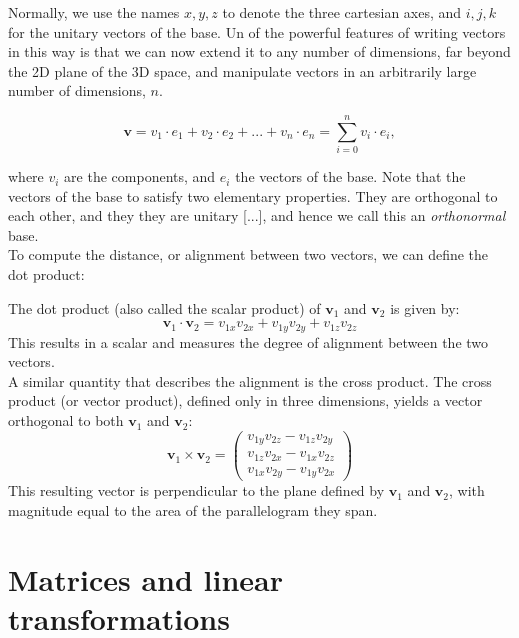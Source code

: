 \documentclass{book}
\begin{document}
Normally, we use the names $x, y, z$ to denote the three cartesian axes, and $i, j, k$ for the unitary vectors of the base. Un of the powerful features of writing vectors in this way is that we can now extend it to any number of dimensions, far beyond the 2D plane of the 3D space, and manipulate vectors in an arbitrarily large number of dimensions, $n$.

\begin{equation}
	\mathbf{v} = v_1 \cdot e_1 + v_2 \cdot e_2 + ... + v_n \cdot e_n = \sum_{i = 0}^{n} v_i \cdot e_i, 
\end{equation}

where $v_i$ are the components, and $e_i$ the vectors of the base. Note that the vectors of the base to satisfy two elementary properties. They are orthogonal to each other, and they they are unitary [...], and hence we call this an \textit{orthonormal} base.\\

To compute the distance, or alignment between two vectors, we can define the dot product:

The dot product (also called the scalar product) of \( \mathbf{v}_1 \) and \( \mathbf{v}_2 \) is given by:
\begin{equation}
	\mathbf{v}_1 \cdot \mathbf{v}_2 = v_{1x}v_{2x} + v_{1y}v_{2y} + v_{1z}v_{2z}
\end{equation}
This results in a scalar and measures the degree of alignment between the two vectors.\\

A similar quantity that describes the alignment is the cross product. The cross product (or vector product), defined only in three dimensions, yields a vector orthogonal to both \( \mathbf{v}_1 \) and \( \mathbf{v}_2 \):
\begin{equation}
	\mathbf{v}_1 \times \mathbf{v}_2 =
	\begin{pmatrix}
		v_{1y}v_{2z} - v_{1z}v_{2y} \\
		v_{1z}v_{2x} - v_{1x}v_{2z} \\
		v_{1x}v_{2y} - v_{1y}v_{2x}
	\end{pmatrix}
\end{equation}
This resulting vector is perpendicular to the plane defined by \( \mathbf{v}_1 \) and \( \mathbf{v}_2 \), with magnitude equal to the area of the parallelogram they span.

\section{Matrices and linear transformations}
\end{document}
